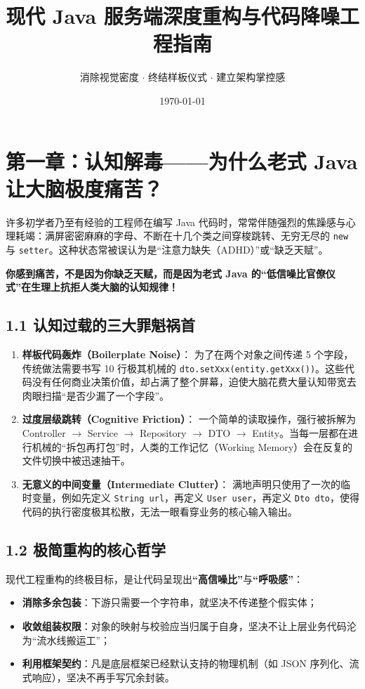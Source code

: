 \documentclass[11pt,a4paper]{ctexart}
\title{\textbf{现代 Java 服务端深度重构与代码降噪工程指南}}
\author{消除视觉密度 $\cdot$ 终结样板仪式 $\cdot$ 建立架构掌控感}
\date{\today}
\begin{document}
\maketitle
\tableofcontents
\newpage

\section{第一章：认知解毒——为什么老式 Java 让大脑极度痛苦？}

许多初学者乃至有经验的工程师在编写 Java 代码时，常常伴随强烈的焦躁感与心理耗竭：满屏密密麻麻的字母、不断在十几个类之间穿梭跳转、无穷无尽的 \texttt{new} 与 \texttt{setter}。这种状态常被误认为是“注意力缺失（ADHD）”或“缺乏天赋”。

\begin{tcolorbox}[colback=red!5!white,colframe=warnred,title=\textbf{核心心理认知真相}]
\textbf{你感到痛苦，不是因为你缺乏天赋，而是因为老式 Java 的“低信噪比官僚仪式”在生理上抗拒人类大脑的认知规律！}
\end{tcolorbox}

\subsection{1.1 认知过载的三大罪魁祸首}
\begin{enumerate}[leftmargin=*]
    \item \textbf{样板代码轰炸（Boilerplate Noise）}：
    为了在两个对象之间传递 5 个字段，传统做法需要书写 10 行极其机械的 \texttt{dto.setXxx(entity.getXxx())}。这些代码没有任何商业决策价值，却占满了整个屏幕，迫使大脑花费大量认知带宽去肉眼扫描“是否少漏了一个字段”。
    \item \textbf{过度层级跳转（Cognitive Friction）}：
    一个简单的读取操作，强行被拆解为 Controller $\to$ Service $\to$ Repository $\to$ DTO $\to$ Entity。当每一层都在进行机械的“拆包再打包”时，人类的工作记忆（Working Memory）会在反复的文件切换中被迅速抽干。
    \item \textbf{无意义的中间变量（Intermediate Clutter）}：
    满地声明只使用了一次的临时变量，例如先定义 \texttt{String url}，再定义 \texttt{User user}，再定义 \texttt{Dto dto}，使得代码的执行密度极其松散，无法一眼看穿业务的核心输入输出。
\end{enumerate}

\subsection{1.2 极简重构的核心哲学}
现代工程重构的终极目标，是让代码呈现出\textbf{“高信噪比”}与\textbf{“呼吸感”}：
\begin{itemize}
    \item \textbf{消除多余包装}：下游只需要一个字符串，就坚决不传递整个假实体；
    \item \textbf{收敛组装权限}：对象的映射与校验应当归属于自身，坚决不让上层业务代码沦为“流水线搬运工”；
    \item \textbf{利用框架契约}：凡是底层框架已经默认支持的物理机制（如 JSON 序列化、流式响应），坚决不再手写冗余封装。
\end{itemize}
\end{document}
